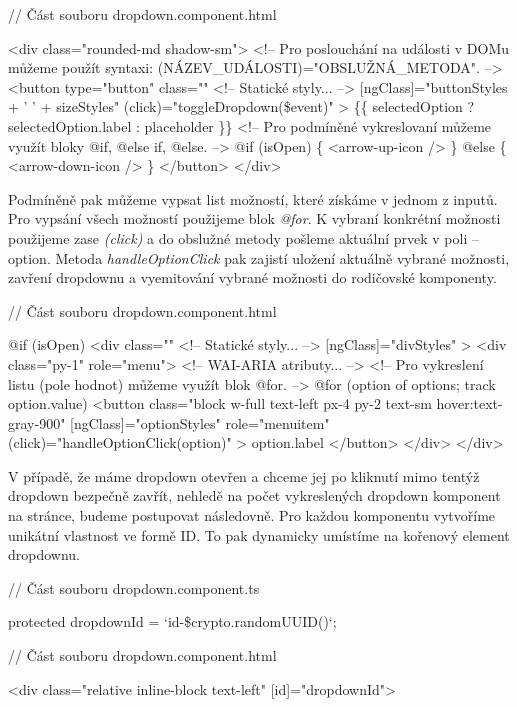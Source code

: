 \begin{prog}
// Část souboru dropdown.component.html

<div class="rounded-md shadow-sm">
  <!-- Pro poslouchání na události v DOMu můžeme 
    použít syntaxi: (NÁZEV_UDÁLOSTI)="OBSLUŽNÁ_METODA". -->
  <button
    type="button"
    class="" <!-- Statické styly... -->
    [ngClass]="buttonStyles + ' ' + sizeStyles"
    (click)="toggleDropdown(\$event)"
  >
    \{\{ selectedOption ? selectedOption.label : placeholder \}\}
    <!-- Pro podmíněné vykreslovaní můžeme využít bloky @if, @else if, @else. -->
    @if (isOpen) \{
      <arrow-up-icon />
    \} @else \{
      <arrow-down-icon />
    \}
  </button>
</div>
\end{prog}

Podmíněně pak můžeme vypsat list možností, které získáme v jednom z inputů. Pro vypsání všech možností použijeme blok \emph{@for}. 
K vybraní konkrétní možnosti použijeme zase \emph{(click)} a do obslužné metody pošleme aktuální prvek v poli -- option. 
Metoda \emph{handleOptionClick} pak zajistí uložení aktuálně vybrané možnosti, zavření dropdownu a vyemitování vybrané možnosti do rodičovské komponenty.

\begin{prog}
// Část souboru dropdown.component.html

@if (isOpen) {
  <div
    class="" <!-- Statické styly... -->
    [ngClass]="divStyles"
  >
    <div class="py-1" role="menu"> <!-- WAI-ARIA atributy... -->
      <!-- Pro vykreslení listu (pole hodnot) můžeme využít blok @for. -->
      @for (option of options; track option.value) {
        <button
          class="block w-full text-left px-4 py-2 text-sm hover:text-gray-900"
          [ngClass]="optionStyles"
          role="menuitem"
          (click)="handleOptionClick(option)"
        >
          {{ option.label }}
        </button>
      }
    </div>
  </div>
}
\end{prog}

V případě, že máme dropdown otevřen a chceme jej po kliknutí mimo tentýž dropdown bezpečně zavřít, nehledě na počet vykreslených dropdown komponent na stránce, budeme postupovat následovně. 
Pro každou komponentu vytvoříme unikátní vlastnost ve formě ID. To pak dynamicky umístíme na kořenový element dropdownu.

\begin{prog}
// Část souboru dropdown.component.ts

protected dropdownId = `id-\${crypto.randomUUID()}`;

// Část souboru dropdown.component.html

<div class="relative inline-block text-left" [id]="dropdownId">
\end{prog}

